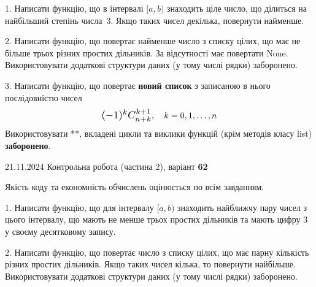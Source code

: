 \documentclass[12pt, ukrainian]{article}
\begin{document}
{{\begin {large}
\vspace{5mm}

1. Написати функцію, що в інтервалі $[a, b)$ знаходить ціле число, що ділиться на найбільший степінь числа 3. Якщо таких чисел декілька, повернути найменше.

\vspace{10mm}


2. Написати функцію, що повертає найменше число з списку цілих, що має не більше трьох різних простих дільників. За відсутності має повертати None. Використовувати додаткові структури даних (у тому числі рядки) заборонено.

\vspace{10mm}


3. 
Написати функцію, що повертає \textbf{новий список} з записаною в нього послідовністю чисел
$$\scalebox{1.2}{$(-1)^{k}C_{n+k}^{k+1}$}, \quad k=0,1,\ldots,n$$
Використовувати **, вкладені цикли та виклики функцій (крім методів класу list) \textbf{заборонено}.

\end{large}
\newpage
{{21.11.2024 Контрольна робота  (частина 2), варіант  \No \textbf { 62 }\par}}


{
\begin {large}
Якість коду та економність обчислень оцінюється по всім завданням.

\vspace{5mm}

1. Написати функцію, що для інтервалу $[a, b)$ знаходить найближчу пару чисел з цього інтервалу, що мають не менше трьох простих дільників та мають цифру 3 у своєму десятковому запису.

\vspace{10mm}


2. Написати функцію, що повертає число з списку цілих, що має парну кількість різних простих дільників. Якщо таких чисел кілька, то повернути найбільше. Використовувати додаткові структури даних (у тому числі рядки) заборонено.


\end{large}}}}
\end{document}

